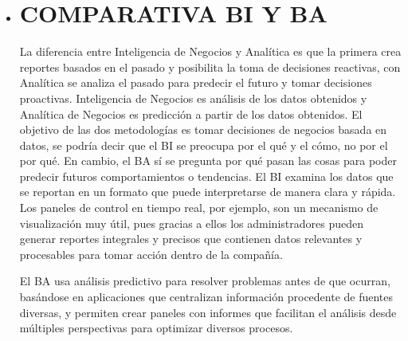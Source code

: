 \documentclass[twoside,twocolumn]{article}
\begin{document}
\begin{itemize}

\item 


\section{COMPARATIVA BI Y BA}
La diferencia entre Inteligencia de Negocios y Analítica es que la primera crea reportes basados en el pasado y posibilita la toma de decisiones reactivas, con Analítica se analiza el pasado para predecir el futuro y tomar decisiones proactivas.
\newline
\newline
Inteligencia de Negocios es análisis de los datos obtenidos y Analítica de Negocios es predicción a partir de los datos obtenidos.
\newline
El objetivo de las dos metodologías es tomar decisiones de negocios basada en datos, se podría decir que el BI se preocupa por el qué y el cómo, no por el por qué. En cambio, el BA sí se pregunta por qué pasan las cosas para poder predecir futuros comportamientos o tendencias.
\newline
\newline
El BI examina los datos que se reportan en un formato que puede interpretarse de manera clara y rápida. Los paneles de control en tiempo real, por ejemplo, son un mecanismo de visualización muy útil, pues gracias a ellos los administradores pueden generar reportes integrales y precisos que contienen datos relevantes y procesables para tomar acción dentro de la compañía.
\newline

El BA usa análisis predictivo para resolver problemas antes de que ocurran, basándose en aplicaciones que centralizan información procedente de fuentes diversas, y permiten crear paneles con informes que facilitan el análisis desde múltiples perspectivas para optimizar diversos procesos.
\newline
\newline


\end{itemize}
\end{document}
